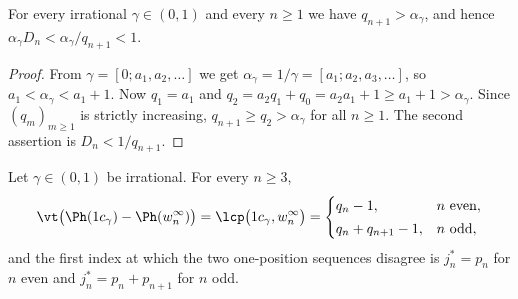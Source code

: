 \begin{lemma}\label{lem:autothreshold}
For every irrational $\gamma\in(0,1)$ and every $n\ge1$ we have
$q_{n+1}>\alpha_\gamma$, and hence
$\alpha_\gamma D_n<\alpha_\gamma/q_{n+1}<1$.
\end{lemma}

\begin{proof}
From $\gamma=[0;a_1,a_2,\dots]$ we get $\alpha_\gamma=1/\gamma=[a_1;a_2,a_3,\dots]$,
so $a_1<\alpha_\gamma<a_1+1$. Now $q_1=a_1$ and $q_2=a_2q_1+q_0=a_2a_1+1\ge
a_1+1>\alpha_\gamma$. Since $(q_m)_{m\ge1}$ is strictly increasing,
$q_{n+1}\ge q_2>\alpha_\gamma$ for all $n\ge1$. The second assertion is
$D_n<1/q_{n+1}$.
\end{proof}

\begin{theorem}\label{thm:alldepth}
Let $\gamma\in(0,1)$ be irrational. For every $n\ge 3$,
\[
\vt\bigl(\Ph(1c_\gamma)-\Ph(w_n^\infty)\bigr)=\lcp\bigl(1c_\gamma,w_n^\infty\bigr)
=\begin{cases}
q_n-1, & n\ \text{even},\\[2pt]
q_n+q_{n+1}-1, & n\ \text{odd},
\end{cases}
\]
and the first index at which the two one-position sequences disagree is
$j^{*}_n=p_n$ for $n$ even and $j^{*}_n=p_n+p_{n+1}$ for $n$ odd.
\end{theorem}

